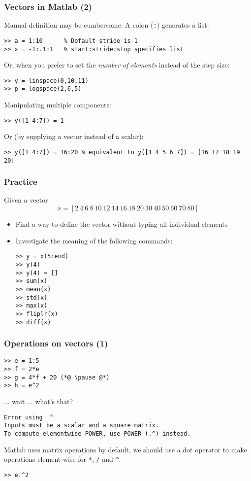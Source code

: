 \begin{frame}[fragile]
  \frametitle{Vectors in Matlab (2)}
  Manual definition may be cumbersome. A colon (\lstinline$:$) generates a list:
  \begin{lstlisting}
>> a = 1:10      % Default stride is 1
>> x = -1:.1:1   % start:stride:stop specifies list
  \end{lstlisting}\pause
  Or, when you prefer to set the \emph{number of elements} instead of the step size:
  \begin{lstlisting}
>> y = linspace(0,10,11)
>> p = logspace(2,6,5)
  \end{lstlisting}\pause
  Manipulating multiple components:
  \begin{lstlisting}
>> y([1 4:7]) = 1
  \end{lstlisting}\pause
  Or (by supplying a vector instead of a scalar):
  \begin{lstlisting}
>> y([1 4:7]) = 16:20 % equivalent to y([1 4 5 6 7]) = [16 17 18 19 20]
  \end{lstlisting}
\end{frame}

\begin{frame}[fragile]
 \frametitle{Practice}
 Given a vector 
 \[ 
    x = \left[2 \ 4 \ 6 \ 8 \ 10 \ 12 \ 14 \ 16 \ 18 \ 20 \ 30 \ 40 \ 50 \ 60 \ 70 \ 80 \right]
 \]
 \begin{itemize}
  \item Find a way to define the vector without typing all individual elements\pause
  \item Investigate the meaning of the following commands:
  \begin{lstlisting}
>> y = x(5:end)
>> y(4)
>> y(4) = []
>> sum(x)
>> mean(x)
>> std(x)
>> max(x)
>> fliplr(x)
>> diff(x)
  \end{lstlisting}
 \end{itemize}
\end{frame}

\begin{frame}[fragile]
  \frametitle{Operations on vectors (1)}
  \begin{lstlisting}
>> e = 1:5
>> f = 2*e
>> g = 4*f + 20 (*@ \pause @*)
>> h = e^2
  \end{lstlisting}\pause
  ... wait ... what's that?
  \begin{lstlisting}[basicstyle=\color{red}\footnotesize\ttfamily,keywordstyle={\color{red}}, identifierstyle=\color{red}]
Error using  ^ 
Inputs must be a scalar and a square matrix.
To compute elementwise POWER, use POWER (.^) instead.
  \end{lstlisting}\pause
  Matlab uses matrix operations by default, we should use a dot operator to make operations element-wise for \lstinline$*$, \lstinline$/$ and \lstinline$^$.
  \begin{lstlisting}
>> e.^2
  \end{lstlisting}
\end{frame}

